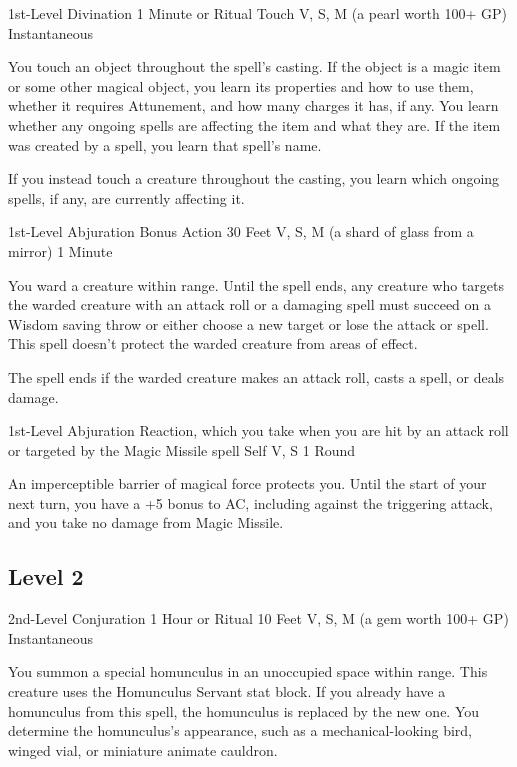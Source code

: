 \documentclass[letterpaper,openany,oneside,twocolumn]{book}
\begin{document}
	{1st-Level Divination}
	{1 Minute or Ritual}
	{Touch}
	{V, S, M (a pearl worth 100+ GP)}
	{Instantaneous}

You touch an object throughout the spell's casting. If the object is a magic item or some other magical object, you learn its properties and how to use them, whether it requires Attunement, and how many charges it has, if any. You learn whether any ongoing spells are affecting the item and what they are. If the item was created by a spell, you learn that spell's name.

If you instead touch a creature throughout the casting, you learn which ongoing spells, if any, are currently affecting it.

	{1st-Level Abjuration}
	{Bonus Action}
	{30 Feet}
	{V, S, M (a shard of glass from a mirror)}
	{1 Minute}

You ward a creature within range. Until the spell ends, any creature who targets the warded creature with an attack roll or a damaging spell must succeed on a Wisdom saving throw or either choose a new target or lose the attack or spell. This spell doesn't protect the warded creature from areas of effect.

The spell ends if the warded creature makes an attack roll, casts a spell, or deals damage.

	{1st-Level Abjuration}
	{Reaction, which you take when you are hit by an attack roll or targeted by the Magic Missile spell}
	{Self}
	{V, S}
	{1 Round}

An imperceptible barrier of magical force protects you. Until the start of your next turn, you have a +5 bonus to AC, including against the triggering attack, and you take no damage from Magic Missile.

\subsection*{Level 2}

	{2nd-Level Conjuration}
	{1 Hour or Ritual}
	{10 Feet}
	{V, S, M (a gem worth 100+ GP)}
	{Instantaneous}

You summon a special homunculus in an unoccupied space within range. This creature uses the Homunculus Servant stat block. If you already have a homunculus from this spell, the homunculus is replaced by the new one. You determine the homunculus's appearance, such as a mechanical-looking bird, winged vial, or miniature animate cauldron.
\end{document}

